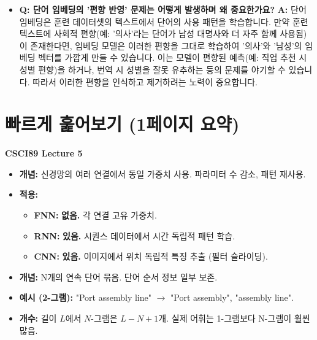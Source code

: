 \documentclass[11pt,a4paper]{article}
\begin{document}
\begin{tcolorbox}[examplebox, title=NLTK 스테밍 코드 예시]
\begin{itemize}
    \item \textbf{Q: 단어 임베딩의 '편향 반영' 문제는 어떻게 발생하며 왜 중요한가요?}
    \textbf{A:} 단어 임베딩은 훈련 데이터셋의 텍스트에서 단어의 사용 패턴을 학습합니다. 만약 훈련 텍스트에 사회적 편향(예: '의사'라는 단어가 남성 대명사와 더 자주 함께 사용됨)이 존재한다면, 임베딩 모델은 이러한 편향을 그대로 학습하여 '의사'와 '남성'의 임베딩 벡터를 가깝게 만들 수 있습니다. 이는 모델이 편향된 예측(예: 직업 추천 시 성별 편향)을 하거나, 번역 시 성별을 잘못 유추하는 등의 문제를 야기할 수 있습니다. 따라서 이러한 편향을 인식하고 제거하려는 노력이 중요합니다.
\end{itemize}

\newpage
\section*{빠르게 훑어보기 (1페이지 요약)}

\begin{tcolorbox}[summarybox, title=핵심 개념 요약: 텍스트 처리 및 임베딩]
\textbf{CSCI89 Lecture 5}
\end{tcolorbox}

\begin{tcolorbox}[mybox, title=1. 가중치 공유 (Weight Sharing)]
\begin{itemize}
    \item \textbf{개념:} 신경망의 여러 연결에서 동일 가중치 사용. 파라미터 수 감소, 패턴 재사용.
    \item \textbf{적용:}
        \begin{itemize}
            \item \textbf{FNN:} \textbf{없음.} 각 연결 고유 가중치.
            \item \textbf{RNN:} \textbf{있음.} 시퀀스 데이터에서 시간 독립적 패턴 학습.
            \item \textbf{CNN:} \textbf{있음.} 이미지에서 위치 독립적 특징 추출 (필터 슬라이딩).
        \end{itemize}
\end{itemize}
\end{tcolorbox}

\begin{tcolorbox}[mybox, title=2. N-그램 토큰화 (N-gram Tokenization)]
\begin{itemize}
    \item \textbf{개념:} N개의 연속 단어 묶음. 단어 순서 정보 일부 보존.
    \item \textbf{예시 (2-그램):} "Port assembly line" $\rightarrow$ "Port assembly", "assembly line".
    \item \textbf{개수:} 길이 $L$에서 $N$-그램은 $L-N+1$개. 실제 어휘는 1-그램보다 N-그램이 훨씬 많음.
\end{itemize}
\end{tcolorbox}


\end{tcolorbox}
\end{document}
